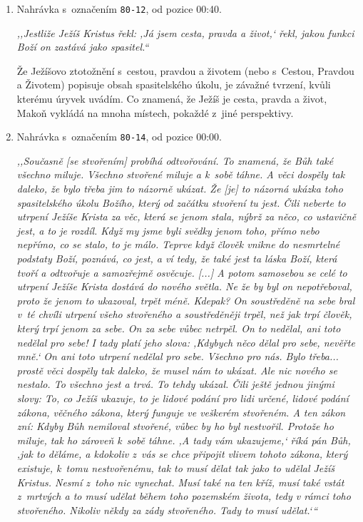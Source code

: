 \begin{enumerate}

\item{
Nahrávka s~označením \texttt{80-12}, od pozice 00:40.

\textit{%
,,Jestliže Ježíš Kristus řekl: ,Já jsem cesta, pravda a život,` řekl, jakou
funkci Boží on zastává jako spasitel.``
}

Že Ježíšovo ztotožnění s~cestou, pravdou a životem
(nebo s~Cestou, Pravdou a Životem)
popisuje obsah spasitelského úkolu, je závažné tvrzení, kvůli kterému úryvek
uvádím. Co znamená, že Ježíš je cesta, pravda a život, Makoň vykládá na mnoha
místech, pokaždé z~jiné perspektivy.%

}

\item{
Nahrávka s~označením \texttt{80-14}, od pozice 00:00.

\textit{%
,,Současně [se stvořením] probíhá odtvořování. To znamená, že Bůh také všechno miluje. Všechno
stvořené miluje a k~sobě táhne. A věci dospěly tak daleko, že bylo třeba jim to
názorně ukázat. Že [je] to názorná ukázka toho spasitelského úkolu Božího, který
od začátku stvoření tu jest. Čili neberte to utrpení Ježíše Krista za věc, která
se jenom stala, nýbrž za něco, co ustavičně jest, a to je rozdíl. Když my jsme
byli svědky jenom toho, přímo nebo nepřímo, co se stalo, to je málo. Teprve když
člověk vnikne do nesmrtelné podstaty Boží, poznává, co jest, a ví tedy, že také
jest ta láska Boží, která tvoří a odtvořuje a samozřejmě osvěcuje. [...] A potom
samosebou se celé to utrpení Ježíše Krista dostává do nového světla. Ne že by
byl on nepotřeboval, proto že jenom to ukazoval, trpět méně. Kdepak? On
soustředěně na sebe bral v~té chvíli utrpení všeho stvořeného a soustředěněji
trpěl, než jak trpí člověk, který trpí jenom za sebe. On za sebe vůbec netrpěl.
On to nedělal, ani toto nedělal pro sebe! I tady platí jeho slova: ,Kdybych něco
dělal pro sebe, nevěřte mně.` On ani toto utrpení nedělal pro sebe. Všechno pro
nás. Bylo třeba... prostě věci dospěly tak daleko, že musel nám to ukázat. Ale
nic nového se nestalo. To všechno jest a trvá. To tehdy ukázal. Čili ještě
jednou jinými slovy: To, co Ježíš ukazuje, to je lidové podání pro lidi určené,
lidové podání zákona, věčného zákona, který funguje ve veškerém stvořeném. A ten
zákon zní: Kdyby Bůh nemiloval stvořené, vůbec by ho byl nestvořil. Protože ho
miluje, tak ho zároveň k~sobě táhne. ,A tady vám ukazujeme,` říká pán Bůh, ,jak
to děláme, a kdokoliv z~vás se chce připojit vlivem tohoto zákona, který
existuje, k~tomu nestvořenému, tak to musí dělat tak jako to udělal Ježíš
Kristus. Nesmí z~toho nic vynechat. Musí také na ten kříž, musí také vstát
z~mrtvých a to musí udělat během toho pozemském života, tedy v rámci toho
stvořeného. Nikoliv někdy za zády stvořeného. Tady to musí udělat.`{}``
}

}
\end{enumerate}
